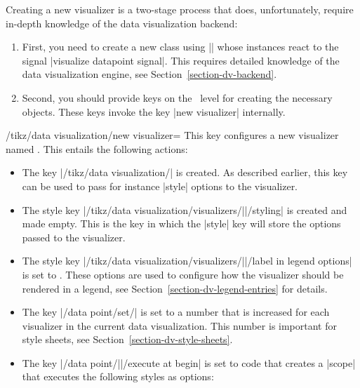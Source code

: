 Creating a new visualizer is a two-stage process that does, unfortunately,
require in-depth knowledge of the data visualization backend:
%
\begin{enumerate}
    \item First, you need to create a new class using |\pgfooclass| whose
        instances react to the signal |visualize datapoint signal|. This
        requires detailed knowledge of the data visualization engine, see
        Section~\ref{section-dv-backend}.
    \item Second, you should provide keys on the \tikzname\ level for creating
        the necessary objects. These keys invoke the key |new visualizer|
        internally.
\end{enumerate}

\begin{key}{/tikz/data visualization/new visualizer=}
    This key configures a new visualizer named . This entails the
    following actions:
    \begin{itemize}
        \item The key |/tikz/data visualization/| is created. As
            described earlier, this key can be used to pass for instance
            |style| options to the visualizer.
        \item The style key
            |/tikz/data visualization/visualizers/||/styling| is
            created and made empty. This is the key in which the |style| key
            will store the options passed to the visualizer.
        \item The style key
            |/tikz/data visualization/visualizers/||/label in legend options|
            is set to . These options are used to
            configure how the visualizer should be rendered in a legend, see
            Section~\ref{section-dv-legend-entries} for details.
        \item The key |/data point/set/| is set to a number that is
            increased for each visualizer in the current data visualization.
            This number is important for style sheets, see
            Section~\ref{section-dv-style-sheets}.
        \item The key |/data point/||/execute at begin| is set to
            code that creates a |{scope}| that executes the following styles as
            options:
            \begin{enumerate}

\end{enumerate}
\end{itemize}
\end{key}
